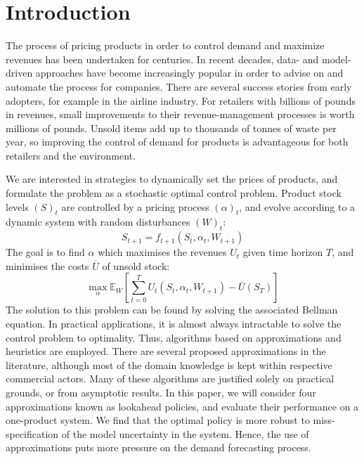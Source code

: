 \documentclass[main.tex]{subfiles}
\begin{document}
\section{Introduction}
The process of pricing products in order to control demand and
maximize revenues has been undertaken for centuries. In recent
decades, data- and model-driven approaches have become increasingly
popular in order to advise on and automate the process for companies.
There are several success stories from early adopters, for example in
the airline industry.
For retailers with billions of pounds in revenues, small
improvements to their revenue-management processes is worth millions
of pounds.
Unsold items add up to thousands of tonnes of waste per year, so
improving the control of demand for products is advantageous
for both retailers and the environment.

We are interested in strategies to dynamically set the prices of products, and
formulate the problem as a stochastic optimal control problem.
Product stock levels $(S)_t$ are controlled by a pricing process
$(\alpha)_t$, and evolve according to a dynamic system with random disturbances
${(W)}_t$:
\begin{equation}
S_{t+1}=f_{t+1}(S_t,\alpha_t,W_{t+1})
\end{equation}
The goal is to find $\alpha$ which maximises the revenues $U_t$
given time horizon $T$, and
minimises the costs $\overline{U}$ of unsold stock:
\begin{equation}
  \max_{\alpha}\mathbb E_W\left[ \sum_{t=0}^TU_t(S_t,\alpha_t,W_{t+1})
  - \overline{U}(S_T)\right]
\end{equation}
The solution to this problem can be found by solving the associated
Bellman equation. In practical applications, it is almost always
intractable to solve the control problem to optimality.
Thus, algorithms based on approximations and heuristics are employed.
There are several proposed approximations in the
literature, although most of the domain knowledge is kept within
respective commercial actors.
Many of these algorithms are justified solely on practical grounds, or
from asymptotic results.
In this paper, we will consider four approximations known as
lookahead policies,
and evaluate their performance on a one-product system.
We find that the optimal policy is more robust to
miss-specification of the model uncertainty in the system.
Hence, the use of approximations puts more pressure on the
demand forecasting process.
\end{document}

